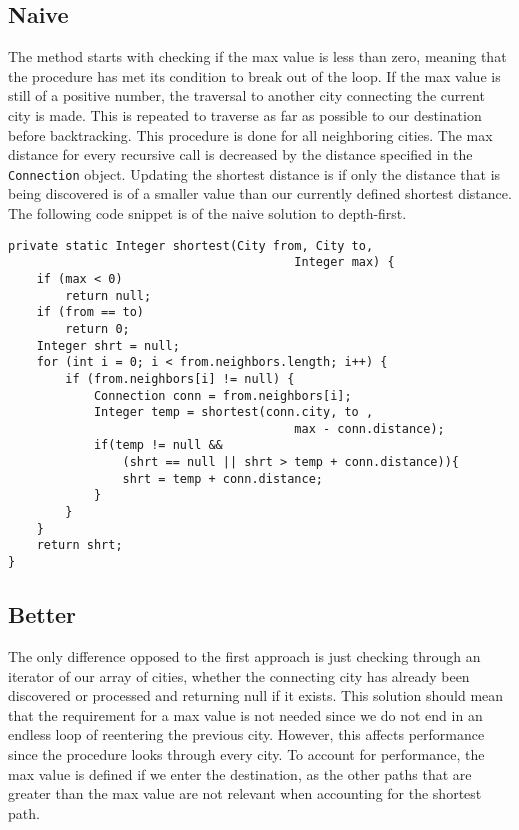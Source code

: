 \documentclass[a4paper,11pt]{article}
\begin{document}
    \subsection*{Naive}

        The method starts with checking if the max value is less than zero, meaning that the procedure has met its condition to break out of the loop. If the max value is still of a positive number, the traversal to another city connecting the current city is made. This is repeated to traverse as far as possible to our destination before backtracking. This procedure is done for all neighboring cities. The max distance for every recursive call is decreased by the distance specified in the \texttt{Connection} object. Updating the shortest distance is if only the distance that is being discovered is of a smaller value than our currently defined shortest distance. The following code snippet is of the naive solution to depth-first.
\begin{verbatim}
private static Integer shortest(City from, City to, 
                                        Integer max) {
    if (max < 0)
        return null;
    if (from == to)
        return 0;
    Integer shrt = null;
    for (int i = 0; i < from.neighbors.length; i++) {
        if (from.neighbors[i] != null) {
            Connection conn = from.neighbors[i];
            Integer temp = shortest(conn.city, to , 
                                        max - conn.distance);
            if(temp != null && 
                (shrt == null || shrt > temp + conn.distance)){
                shrt = temp + conn.distance;
            }
        }
    }
    return shrt;
}
\end{verbatim}

    \subsection*{Better}

        The only difference opposed to the first approach is just checking through an iterator of our array of cities, whether the connecting city has already been discovered or processed and returning null if it exists. This solution should mean that the requirement for a max value is not needed since we do not end in an endless loop of reentering the previous city. However, this affects performance since the procedure looks through every city. To account for performance, the max value is defined if we enter the destination, as the other paths that are greater than the max value are not relevant when accounting for the shortest path.
\end{document}
